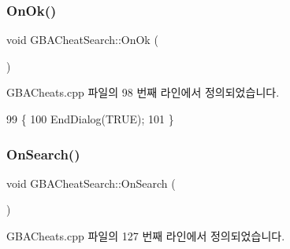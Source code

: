 \subsubsection{\texorpdfstring{On\+Ok()}{OnOk()}}
{\footnotesize\ttfamily void G\+B\+A\+Cheat\+Search\+::\+On\+Ok (\begin{DoxyParamCaption}{ }\end{DoxyParamCaption})\hspace{0.3cm}{\ttfamily [protected]}}



G\+B\+A\+Cheats.\+cpp 파일의 98 번째 라인에서 정의되었습니다.


\begin{DoxyCode}
99 \{
100   EndDialog(TRUE);
101 \}
\end{DoxyCode}
\mbox{\label{class_g_b_a_cheat_search_a2b933c2b548983257f7e92da9bbb1695}} 
\subsubsection{\texorpdfstring{On\+Search()}{OnSearch()}}
{\footnotesize\ttfamily void G\+B\+A\+Cheat\+Search\+::\+On\+Search (\begin{DoxyParamCaption}{ }\end{DoxyParamCaption})\hspace{0.3cm}{\ttfamily [protected]}}



G\+B\+A\+Cheats.\+cpp 파일의 127 번째 라인에서 정의되었습니다.


